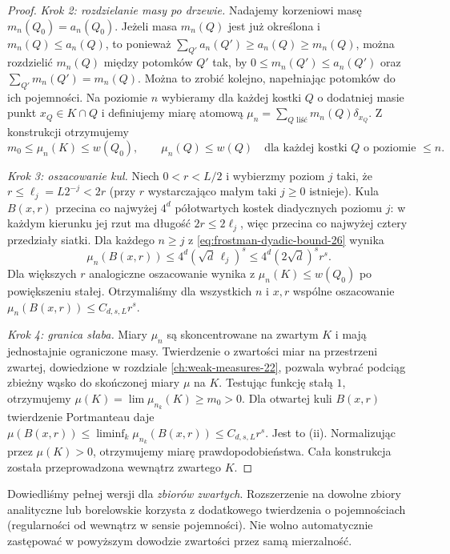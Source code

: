 \begin{proof}
\emph{Krok 2: rozdzielanie masy po drzewie.} Nadajemy
korzeniowi masę $m_n(Q_0)=a_n(Q_0)$.
Jeżeli masa $m_n(Q)$ jest już określona i
$m_n(Q)\le a_n(Q)$, to ponieważ
$\sum_{Q'}a_n(Q')\ge a_n(Q)\ge m_n(Q)$,
można rozdzielić $m_n(Q)$ między potomków $Q'$
tak, by $0\le m_n(Q')\le a_n(Q')$ oraz
$\sum_{Q'}m_n(Q')=m_n(Q)$. Można to zrobić
kolejno, napełniając potomków do ich pojemności.
Na poziomie $n$ wybieramy dla każdej kostki
$Q$ o dodatniej masie punkt $x_Q\in K\cap Q$
i definiujemy miarę atomową
$\mu_n=\sum_{Q\text{ liść}}m_n(Q)\delta_{x_Q}$.
Z konstrukcji otrzymujemy
\begin{equation}\label{eq:frostman-dyadic-bound-26}
 m_0\le\mu_n(K)\le w(Q_0),\qquad
 \mu_n(Q)\le w(Q)
 \quad\text{dla każdej kostki }Q\text{ o poziomie }\le n.
\end{equation}

\emph{Krok 3: oszacowanie kul.} Niech $0<r<L/2$
i wybierzmy poziom $j$ taki, że
$r\le\ell_j=L2^{-j}<2r$ (przy $r$ wystarczająco
małym taki $j\ge0$ istnieje). Kula $B(x,r)$
przecina co najwyżej $4^d$ półotwartych kostek
diadycznych poziomu $j$: w każdym kierunku jej
rzut ma długość $2r\le2\ell_j$, więc przecina
co najwyżej cztery przedziały siatki.
Dla każdego $n\ge j$ z
\eqref{eq:frostman-dyadic-bound-26} wynika
\[
 \mu_n(B(x,r))\le4^d(\sqrt d\,\ell_j)^s
 \le4^d(2\sqrt d)^s r^s.
\]
Dla większych $r$ analogiczne oszacowanie wynika z
$\mu_n(K)\le w(Q_0)$ po powiększeniu stałej.
Otrzymaliśmy dla wszystkich $n$ i $x,r$ wspólne
oszacowanie $\mu_n(B(x,r))\le C_{d,s,L}r^s$.

\emph{Krok 4: granica słaba.} Miary $\mu_n$ są
skoncentrowane na zwartym $K$ i mają jednostajnie
ograniczone masy. Twierdzenie o zwartości miar na
przestrzeni zwartej, dowiedzione w rozdziale
\ref{ch:weak-measures-22}, pozwala wybrać podciąg
zbieżny wąsko do skończonej miary $\mu$ na $K$.
Testując funkcję stałą $1$, otrzymujemy
$\mu(K)=\lim\mu_{n_k}(K)\ge m_0>0$.
Dla otwartej kuli $B(x,r)$ twierdzenie Portmanteau
daje
$\mu(B(x,r))\le\liminf_k\mu_{n_k}(B(x,r))
\le C_{d,s,L}r^s$. Jest to (ii).
Normalizując przez $\mu(K)>0$, otrzymujemy miarę
prawdopodobieństwa. Cała konstrukcja została
przeprowadzona wewnątrz zwartego $K$.
\end{proof}

\begin{uwaga}
Dowiedliśmy pełnej wersji dla \emph{zbiorów zwartych}.
Rozszerzenie na dowolne zbiory analityczne lub borelowskie
korzysta z dodatkowego twierdzenia o pojemnościach
(regularności od wewnątrz w sensie pojemności).
Nie wolno automatycznie zastępować w powyższym dowodzie
zwartości przez samą mierzalność.
\end{uwaga}

